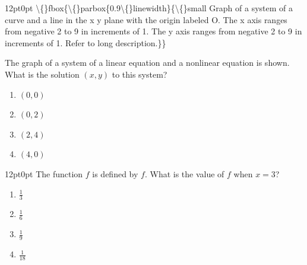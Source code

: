 \documentclass[11pt, twocolumn]{article}
\newcounter{questionnum}
\begin{document}
\vspace{6pt}\noindent
\begin{minipage}{\columnwidth}\raggedright
\noindent{}\par\vspace{8pt}
\begin{adjustwidth}{12pt}{0pt}
\textbackslash\{\}fbox\{\textbackslash\{\}parbox\{0.9\textbackslash\{\}linewidth\}\{\textbackslash\{\}small Graph of a system of a curve and a line in the x y plane with the origin labeled O. The x axis ranges from negative 2 to 9 in increments of 1. The y axis ranges from negative 2 to 9 in increments of 1. Refer to long description.\}\}

The graph of a system of a linear equation and a nonlinear equation is shown. What is the solution $(x,y)$ to this system?
\begin{enumerate}[label=\Alph*),leftmargin=18pt,topsep=3pt,itemsep=2pt]
  \item $(0,0)$
  \item $(0,2)$
  \item $(2,4)$
  \item $(4,0)$
\end{enumerate}
\end{adjustwidth}
\end{minipage}\par

\vspace{6pt}\noindent
\begin{minipage}{\columnwidth}\raggedright
\noindent{}\par\vspace{8pt}
\begin{adjustwidth}{12pt}{0pt}
The function $f$ is defined by $f$. What is the value of $f$ when $x = 3$?
\begin{enumerate}[label=\Alph*),leftmargin=18pt,topsep=3pt,itemsep=2pt]
  \item $\frac{1}{3}$
  \item $\frac{1}{6}$
  \item $\frac{1}{9}$
  \item $\frac{1}{18}$
\end{enumerate}
\end{adjustwidth}
\end{minipage}\par
\end{document}
